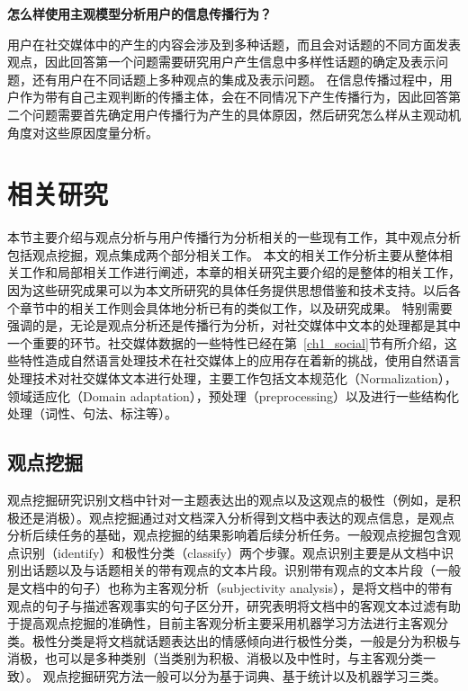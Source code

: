 \textbf{怎么样使用主观模型分析用户的信息传播行为？}

用户在社交媒体中的产生的内容会涉及到多种话题，而且会对话题的不同方面发表观点，因此回答第一个问题需要研究用户产生信息中多样性话题的确定及表示问题，还有用户在不同话题上多种观点的集成及表示问题。
在信息传播过程中，用户作为带有自己主观判断的传播主体，会在不同情况下产生传播行为，因此回答第二个问题需要首先确定用户传播行为产生的具体原因，然后研究怎么样从主观动机角度对这些原因度量分析。

\section{相关研究}
本节主要介绍与观点分析与用户传播行为分析相关的一些现有工作，其中观点分析包括观点挖掘，观点集成两个部分相关工作。
本文的相关工作分析主要从整体相关工作和局部相关工作进行阐述，本章的相关研究主要介绍的是整体的相关工作，因为这些研究成果可以为本文所研究的具体任务提供思想借鉴和技术支持。以后各个章节中的相关工作则会具体地分析已有的类似工作，以及研究成果。
特别需要强调的是，无论是观点分析还是传播行为分析，对社交媒体中文本的处理都是其中一个重要的环节。社交媒体数据的一些特性已经在第~\ref{ch1_social}节有所介绍，这些特性造成自然语言处理技术在社交媒体上的应用存在着新的挑战，使用自然语言处理技术对社交媒体文本进行处理，主要工作包括文本规范化（Normalization），领域适应化（Domain adaptation），预处理（preprocessing）以及进行一些结构化处理（词性、句法、标注等）。

\subsection{观点挖掘}
\label{ch_mining}
观点挖掘研究识别文档中针对一主题表达出的观点以及这观点的极性（例如，是积极还是消极）。观点挖掘通过对文档深入分析得到文档中表达的观点信息，是观点分析后续任务的基础，观点挖掘的结果影响着后续分析任务。一般观点挖掘包含观点识别（identify）和极性分类（classify）两个步骤。观点识别主要是从文档中识别出话题以及与话题相关的带有观点的文本片段。识别带有观点的文本片段（一般是文档中的句子）也称为主客观分析（subjectivity analysis），是将文档中的带有观点的句子与描述客观事实的句子区分开，研究表明将文档中的客观文本过滤有助于提高观点挖掘的准确性，目前主客观分析主要采用机器学习方法进行主客观分类。极性分类是将文档就话题表达出的情感倾向进行极性分类，一般是分为积极与消极，也可以是多种类别（当类别为积极、消极以及中性时，与主客观分类一致）。
观点挖掘研究方法一般可以分为基于词典、基于统计以及机器学习三类。

